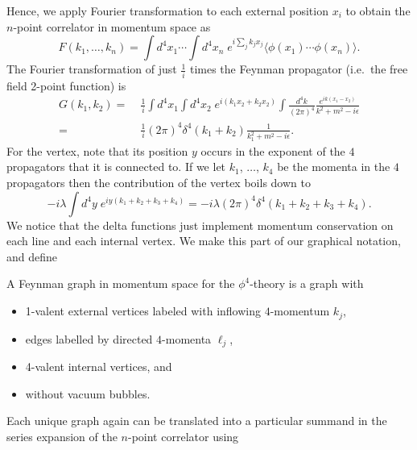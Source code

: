 Hence, we apply Fourier transformation to each external position $x_i$
to obtain the $n$-point correlator in momentum space as
\begin{equation} 
  F(k_1, \dots, k_n) = 
  \int d^4x_1 \cdots 
  \int d^4x_n \;
  e^{i \sum_j k_j x_j}
  \langle \phi(x_1) \cdots \phi(x_n) \rangle.
\end{equation}
The Fourier transformation of just $\frac{1}{i}$ times the Feynman
propagator (i.e.\ the free field 2-point function) is
\begin{equation}
  \begin{split}
    G(k_1, k_2) =&\;
    \frac{1}{i}
    \int d^4x_1 \int d^4x_2\;
    e^{i( k_1 x_2 + k_2 x_2)}
    \int \frac{d^4k}{(2\pi)^4}
    \frac{e^{i k (x_1-x_2)}}{k^2 + m^2 -i\epsilon}    
    \\ =&\;
    \frac{1}{i}
    (2\pi)^4 \delta^4(k_1+k_2) \frac{1}{k_1^2 + m^2 - i\epsilon}.
  \end{split}
\end{equation}
For the vertex, note that its position $y$ occurs in the exponent of
the $4$ propagators that it is connected to. If we let $k_1$, $\dots$,
$k_4$ be the momenta in the $4$ propagators then the contribution of
the vertex boils down to
\begin{equation}
  -i \lambda \int d^4y \; e^{iy(k_1+k_2 + k_3 + k_4)}
  =
  -i \lambda (2\pi)^4 \delta^4(k_1+k_2 + k_3 + k_4).
\end{equation}
We notice that the delta functions just implement momentum
conservation on each line and each internal vertex. We make this part
of our graphical notation, and define
\begin{definition}
  A Feynman graph in momentum space for the $\phi^4$-theory is a graph
  with
  \begin{itemize}
  \item 1-valent external vertices labeled with inflowing
    $4$-momentum $k_j$,
  \item edges labelled by directed $4$-momenta $\ell_j$,
  \item 4-valent internal vertices, and
  \item without vacuum bubbles.
  \end{itemize}
\end{definition}
Each unique graph again can be translated into a particular summand in
the series expansion of the $n$-point correlator using 
